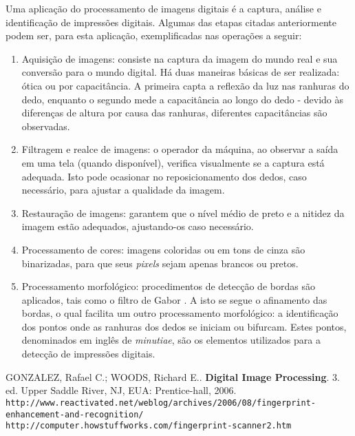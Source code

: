 \documentclass[10pt,a4paper]{article}
\begin{document}
Uma aplicação do processamento de imagens digitais é a captura, análise e identificação de impressões digitais. Algumas das etapas citadas anteriormente podem ser, para esta aplicação, exemplificadas nas operações a seguir:

\begin{enumerate}
 \item Aquisição de imagens: consiste na captura da imagem do mundo real e sua conversão para o mundo digital. Há duas maneiras básicas de ser realizada: ótica ou por capacitância\cite{howstuffworks}. A primeira capta a reflexão da luz nas ranhuras do dedo, enquanto o segundo mede a capacitância ao longo do dedo - devido às diferenças de altura por causa das ranhuras, diferentes capacitâncias são observadas.

 \item Filtragem e realce de imagens: o operador da máquina, ao observar a saída em uma tela (quando disponível), verifica visualmente se a captura está adequada. Isto pode ocasionar no reposicionamento dos dedos, caso necessário, para ajustar a qualidade da imagem.

 \item Restauração de imagens: garantem que o nível médio de preto e a nitidez da imagem estão adequados, ajustando-os caso necessário.

 \item Processamento de cores: imagens coloridas ou em tons de cinza são binarizadas, para que seus \textit{pixels} sejam apenas brancos ou pretos.
 \setcounter{enumi}{8}

 \item Processamento morfológico: procedimentos de detecção de bordas são aplicados, tais como o filtro de Gabor \cite{fingerprint}. A isto se segue o afinamento das bordas, o qual facilita um outro processamento morfológico: a identificação dos pontos onde as ranhuras dos dedos se iniciam ou bifurcam. Estes pontos, denominados em inglês de \textit{minutiae}, são os elementos utilizados para a detecção de impressões digitais.
\end{enumerate}


\begin{thebibliography}{99}
   GONZALEZ, Rafael C.; WOODS, Richard E.. \textbf{Digital Image Processing}. 3. ed. Upper Saddle River, NJ, EUA: Prentice-hall, 2006.
   \texttt{http://www.reactivated.net/weblog/archives/2006/08/fingerprint-enhancement-and-recognition/}
   \texttt{http://computer.howstuffworks.com/fingerprint-scanner2.htm}
\end{thebibliography}
\end{document}
